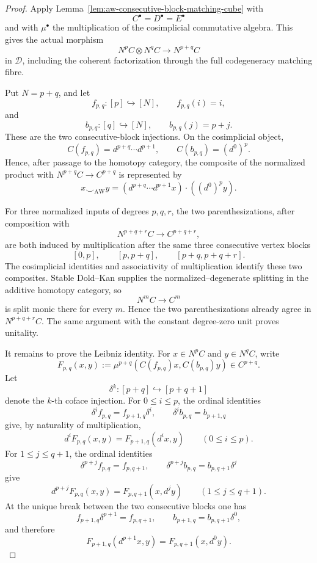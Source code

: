 \begin{proof}
Apply Lemma~\ref{lem:aw-consecutive-block-matching-cube} with
\[
    C^\bullet=D^\bullet=E^\bullet
\]
and with \(\mu^\bullet\) the multiplication of the cosimplicial commutative
algebra.  This gives the actual morphism
\[
    N^pC\otimes N^qC
    \longrightarrow
    N^{p+q}C
\]
in \(\mathcal D\), including the coherent factorization through the full
codegeneracy matching fibre.

Put \(N=p+q\), and let
\[
    f_{p,q}:[p]\hookrightarrow[N],
    \qquad
    f_{p,q}(i)=i,
\]
and
\[
    b_{p,q}:[q]\hookrightarrow[N],
    \qquad
    b_{p,q}(j)=p+j.
\]
These are the two consecutive-block injections.  On the cosimplicial object,
\[
    C(f_{p,q})
    =
    d^{p+q}\cdots d^{p+1},
    \qquad
    C(b_{p,q})
    =
    (d^0)^p.
\]
Hence, after passage to the homotopy category, the composite of the normalized
product with \(N^{p+q}C\to C^{p+q}\) is represented by
\[
    x\smile_{\mathrm{AW}}y
    =
    \left(
        d^{p+q}\cdots d^{p+1}x
    \right)
    \cdot
    \left(
        (d^0)^py
    \right).
\]

For three normalized inputs of degrees \(p,q,r\), the two parenthesizations,
after composition with
\[
    N^{p+q+r}C\longrightarrow C^{p+q+r},
\]
are both induced by multiplication after the same three consecutive vertex
blocks
\[
    [0,p],
    \qquad
    [p,p+q],
    \qquad
    [p+q,p+q+r].
\]
The cosimplicial identities and associativity of multiplication identify
these two composites.  Stable Dold--Kan supplies the normalized--degenerate
splitting in the additive homotopy category, so
\[
    N^{m}C\longrightarrow C^{m}
\]
is split monic there for every \(m\).  Hence the two parenthesizations already
agree in \(N^{p+q+r}C\).  The same argument with the constant degree-zero unit
proves unitality.

It remains to prove the Leibniz identity.  For \(x\in N^pC\) and
\(y\in N^qC\), write
\[
    F_{p,q}(x,y)
    :=
    \mu^{p+q}
    \left(
        C(f_{p,q})x,
        C(b_{p,q})y
    \right)
    \in C^{p+q}.
\]
Let
\[
    \delta^k:[p+q]\hookrightarrow[p+q+1]
\]
denote the \(k\)-th coface injection.  For \(0\leq i\leq p\), the ordinal
identities
\[
    \delta^if_{p,q}
    =
    f_{p+1,q}\delta^i,
    \qquad
    \delta^ib_{p,q}
    =
    b_{p+1,q}
\]
give, by naturality of multiplication,
\[
\boxed{
    d^iF_{p,q}(x,y)
    =
    F_{p+1,q}(d^ix,y)
    \qquad(0\leq i\leq p).
}
\]
For \(1\leq j\leq q+1\), the ordinal identities
\[
    \delta^{p+j}f_{p,q}
    =
    f_{p,q+1},
    \qquad
    \delta^{p+j}b_{p,q}
    =
    b_{p,q+1}\delta^j
\]
give
\[
\boxed{
    d^{p+j}F_{p,q}(x,y)
    =
    F_{p,q+1}(x,d^jy)
    \qquad(1\leq j\leq q+1).
}
\]
At the unique break between the two consecutive blocks one has
\[
    f_{p+1,q}\delta^{p+1}
    =
    f_{p,q+1},
    \qquad
    b_{p+1,q}
    =
    b_{p,q+1}\delta^0,
\]
and therefore
\[
\boxed{
    F_{p+1,q}(d^{p+1}x,y)
    =
    F_{p,q+1}(x,d^0y).
}
\]


\end{proof}
